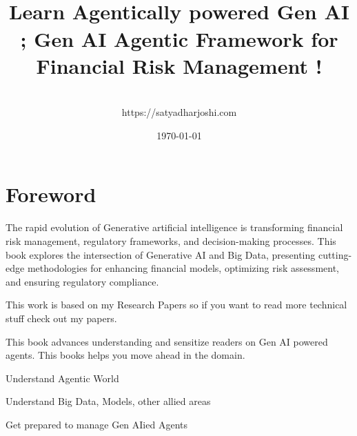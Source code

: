 \documentclass[a4paper,12pt]{scrbook}
\begin{document}
	
	\title{\\\small{Learn Agentically powered Gen AI ;  
			Gen AI Agentic Framework for Financial Risk Management !}}
	\author{
		\\https://satyadharjoshi.com
	}
	\date{\today}
	
	\maketitle
	\tableofcontents
	
	\listoffigures
	
	\listoflistings
	
	\chapter*{Foreword}

	The rapid evolution of Generative artificial intelligence is transforming financial risk management, regulatory frameworks, and decision-making processes. 
	This book explores the intersection of Generative AI and Big Data, presenting cutting-edge methodologies for enhancing financial models, optimizing risk assessment, and ensuring regulatory compliance. 
	
	This work is based on my Research Papers so if you want to read more technical stuff check out my papers. 
	
	
	
	This book advances understanding and sensitize readers on Gen AI powered agents. This books helps you move ahead in the domain.
	
	\begin{arrows}
		\item Understand Agentic World
		\item Understand Big Data, Models, other allied areas
		\item Get prepared to manage Gen AIied Agents 
	\end{arrows}
	
	
\end{document}
